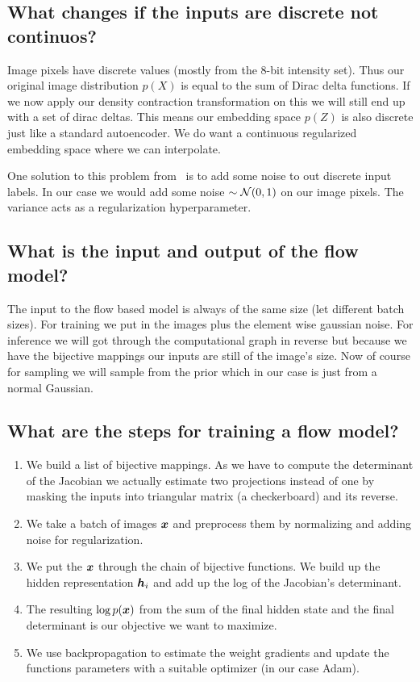 \documentclass{article}
\begin{document}
\subsection{What changes if the inputs are discrete not continuos?}
Image pixels have discrete values (mostly from the 8-bit intensity set).
Thus our original image distribution \(p(X)\) is equal to the sum of Dirac delta functions.
If we now apply our density contraction transformation on this we will still end up with a set of dirac deltas.
This means our embedding space \(p(Z)\) is also discrete just like a standard autoencoder.
We do want a  continuous regularized embedding space where we can interpolate.

One solution to this problem from~\cite{ho2019} is to add some noise to out discrete input labels.
In our case we would add some noise \(\sim \mathcal{N}(0,1)\) on our image pixels.
The variance acts as a regularization hyperparameter.

\subsection{What is the input and output of the flow model?}
The input to the flow based model is always of the same size (let different batch sizes).
For training we put in the images plus the element wise gaussian noise.
For inference we will got through the computational graph in reverse but because we have the bijective mappings our inputs are still of the image's size.
Now of course for sampling we will sample from the prior which in our case is just from a normal Gaussian.

\subsection{What are the steps for training a flow model?}
\begin{enumerate}
  \item We build a list of bijective mappings.
  As we have to compute the determinant of the Jacobian we actually estimate two projections instead of one by masking the inputs into triangular matrix (a checkerboard) and its reverse.
  \item We take a batch of images \(\B{x}\) and preprocess them by normalizing and adding noise for regularization.
  \item We put the \(\B{x}\) through the chain of bijective functions.
  We build up the hidden representation \(\B{h}_i\) and add up the log of the Jacobian's determinant.
  \item The resulting \(\log p(\B{x})\) from the sum of the final hidden state and the final determinant is our objective we want to maximize.
  \item We use backpropagation to estimate the weight gradients and update the functions parameters with a suitable optimizer (in our case Adam).
\end{enumerate}
\end{document}
